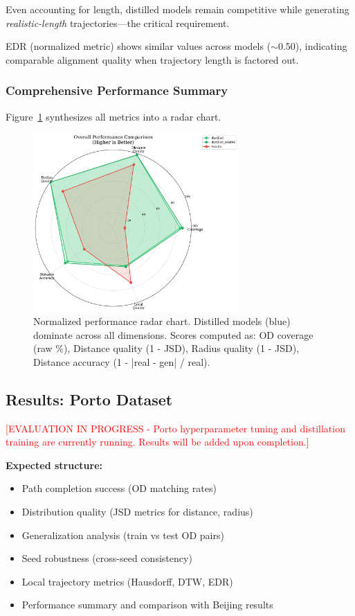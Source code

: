 Even accounting for length, distilled models remain competitive while generating \emph{realistic-length} trajectories—the critical requirement.

EDR (normalized metric) shows similar values across models ($\sim$0.50), indicating comparable alignment quality when trajectory length is factored out.

\subsubsection{Comprehensive Performance Summary}

Figure~\ref{fig:performance-radar} synthesizes all metrics into a radar chart.

\begin{figure}[h]
    \centering
    \includegraphics[width=0.7\textwidth]{assets/plots/hoser/performance_radar.pdf}
    \caption{Normalized performance radar chart. Distilled models (blue) dominate across all dimensions. Scores computed as: OD coverage (raw \%), Distance quality (1 - JSD), Radius quality (1 - JSD), Distance accuracy (1 - |real - gen| / real).}
    \label{fig:performance-radar}
\end{figure}

\subsection{Results: Porto Dataset}
\label{sec:eval-porto}

\textcolor{red}{[EVALUATION IN PROGRESS - Porto hyperparameter tuning and distillation training are currently running. Results will be added upon completion.]}

\textbf{Expected structure:}
\begin{itemize}[noitemsep,topsep=0pt]
    \item Path completion success (OD matching rates)
    \item Distribution quality (JSD metrics for distance, radius)
    \item Generalization analysis (train vs test OD pairs)
    \item Seed robustness (cross-seed consistency)
    \item Local trajectory metrics (Hausdorff, DTW, EDR)
    \item Performance summary and comparison with Beijing results
\end{itemize}

